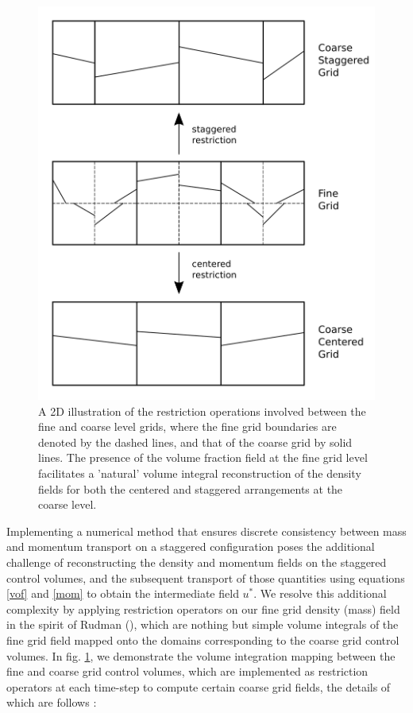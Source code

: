\begin{figure}[h!]
\centering
\includegraphics[width = \textwidth]{plots/restriction.png}
\caption{A 2D illustration of the restriction operations involved
	between the fine and coarse level grids, where the fine 
	grid boundaries are denoted by the dashed lines, 
	and that of the coarse grid by solid lines. 
	The presence of the volume fraction field at the fine 
	grid level facilitates a 'natural' volume integral 
	reconstruction of the density fields for both 
	the centered and staggered arrangements at the coarse level.} 
    \label{restrict}
\end{figure}


Implementing a numerical method that ensures discrete consistency 
between mass and momentum transport on a staggered configuration 
poses the additional challenge of reconstructing the density and 
momentum fields on the staggered control volumes, and the 
subsequent transport of those quantities using equations 
\ref{vof} and \ref{mom} to obtain the intermediate field $u^{*}$. 
We resolve this additional complexity by applying restriction operators 
on our fine grid density (mass) field in the spirit of 
Rudman (\cite{rudman1998volume}), which are nothing but simple volume 
integrals of the fine grid field mapped onto the domains corresponding 
to the coarse grid control volumes. 
In fig. \ref{restrict}, we demonstrate the volume integration 
mapping between the fine and coarse grid control volumes, 
which are implemented as restriction operators at each time-step
to compute certain coarse grid fields, the details of which are follows : 


